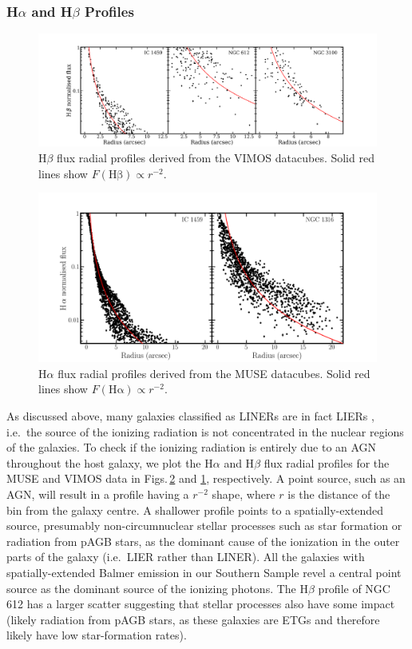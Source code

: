\documentclass[a4paper,fleqn,usenatbib]{mnras}
\begin{document}
		\subsubsection{H$\alpha$ and H$\beta$ Profiles}
			\label{subsubsec:Hb}

			\begin{figure}
				\centering
				\includegraphics[width=\columnwidth]{Hbeta_profile.png}
				\caption{H$\beta$ flux radial profiles derived from the VIMOS datacubes. Solid red lines show $F(\mathrm{H\beta}) \propto r^{-2}$.}
				\label{fig:Hb_profile_VIMOS}
			\end{figure}

			\begin{figure}
				\centering
				\includegraphics[width=0.73\columnwidth]{Halpha_profile.png}
				\caption{H$\alpha$ flux radial profiles derived from the MUSE datacubes. Solid red lines show $F(\mathrm{H\alpha}) \propto r^{-2}$.}
				\label{fig:Ha_profile_MUSE}
			\end{figure}
			
			As discussed above, many galaxies classified as LINERs are in fact LIERs \citep[see e.g.][]{Sarzi2005, Sarzi2010, Singh2013, Belfiore2016}, i.e.\ the source of the ionizing radiation is not concentrated in the nuclear regions of the galaxies. To check if the ionizing radiation is entirely due to an AGN throughout the host galaxy, we plot the H$\alpha$ and H$\beta$ flux radial profiles for the MUSE and VIMOS data in Figs.\,\ref{fig:Ha_profile_MUSE} and \ref{fig:Hb_profile_VIMOS}, respectively. A point source, such as an AGN, will result in a profile having a $r^{-2}$ shape, where $r$ is the distance of the bin from the galaxy centre. A shallower profile points to a spatially-extended source, presumably non-circumnuclear stellar processes such as star formation or radiation from pAGB stars, as the dominant cause of the ionization in the outer parts of the galaxy (i.e.\ LIER rather than LINER). All the galaxies with spatially-extended Balmer emission in our Southern Sample revel a central point source as the dominant source of the ionizing photons. The H$\beta$ profile of NGC 612 has a larger scatter suggesting that stellar processes also have some impact (likely radiation from pAGB stars, as these galaxies are ETGs and therefore likely have low star-formation rates).
\end{document}
